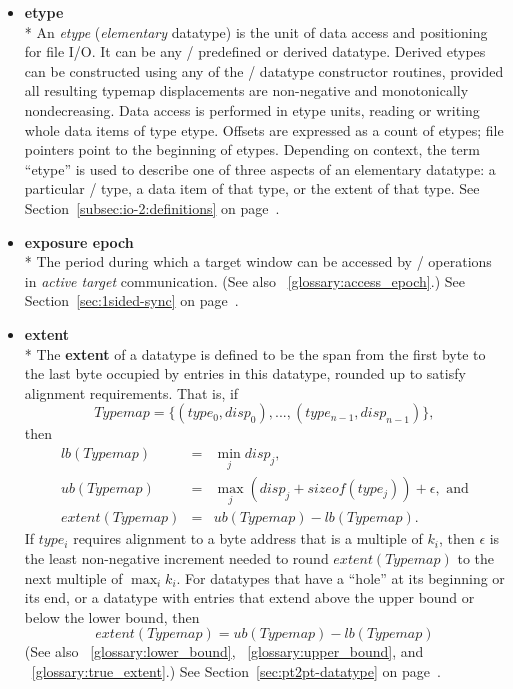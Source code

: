 \begin{itemize}
\label{glossary:etype}
\item \textbf{ etype} \\* 
An {\it etype} ({\it elementary} datatype)
is the unit of data access and positioning for file I/O.
It can be any \MPI/ predefined or derived datatype.
Derived etypes can be constructed
using any of the \MPI/ datatype constructor routines,
provided all resulting typemap displacements are non-negative
and monotonically nondecreasing.
Data access is performed in etype units,
reading or writing whole data items of type etype.
Offsets are expressed as a count of etypes;
file pointers point to the beginning of etypes.
Depending on context,
the term ``etype'' is used to describe one of three aspects
of an elementary datatype:
a particular \MPI/ type,
a data item of that type,
or the extent of that type.
See Section~\ref{subsec:io-2:definitions} on page~\pageref{subsec:io-2:definitions}.

\label{glossary:exposure_epoch}
\item \textbf{ exposure epoch} \\*
The period during which a target window can be accessed by \RMA/
operations in {\it active target} communication.
(See also ~\ref{glossary:access_epoch}.)
See Section~\ref{sec:1sided-sync} on page~\pageref{sec:1sided-sync}.

\label{glossary:extent}
\item \textbf{ extent} \\*
The {\bf extent} of a datatype is defined to
be the span from the first byte to the last byte occupied by entries in this
datatype, rounded up to satisfy alignment requirements.
That is, if
\[
Typemap = \{ (type_0,disp_0), ..., (type_{n-1}, disp_{n-1}) \} ,
\]
then
\begin{eqnarray}
lb(Typemap) & = & \min_j disp_j , \nonumber \\
ub(Typemap) & = & \max_j (disp_j + sizeof(type_j)) + \epsilon , \mbox{ and}
\nonumber \\ extent(Typemap) & = & ub(Typemap) -lb(Typemap).
\end{eqnarray}
If $type_i$ requires alignment to a byte address that 
is
a multiple
of $k_i$,
then $\epsilon$ is the least non-negative increment needed to round
$extent(Typemap)$ to the next multiple of $\max_i k_i$.
For datatypes that 
have a ``hole'' at its beginning or its end, or a datatype with
entries that extend above the upper bound or below the lower bound, then
\label{eq:pt2pt-extent}
\[
extent(Typemap) = ub(Typemap) - lb(Typemap)
\]
(See also ~\ref{glossary:lower_bound}, ~\ref{glossary:upper_bound}, and ~\ref{glossary:true_extent}.)
See Section~\ref{sec:pt2pt-datatype} on page~\pageref{sec:pt2pt-datatype}.


\end{itemize}
